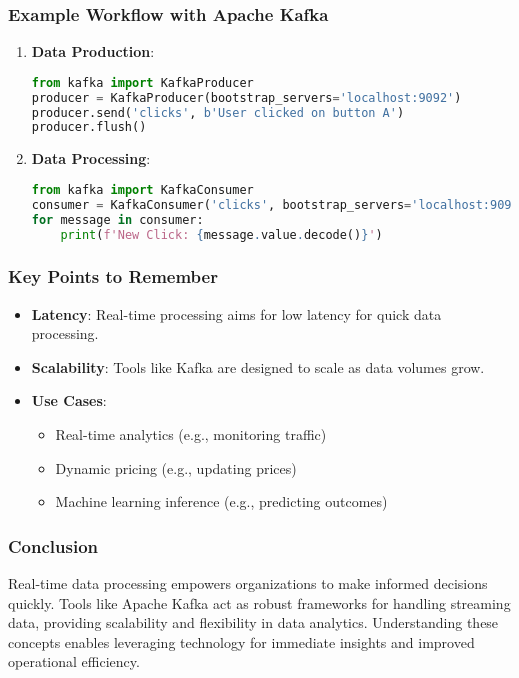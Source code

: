 \documentclass[aspectratio=169]{beamer}
\begin{document}
\begin{frame}[fragile]
    \frametitle{Example Workflow with Apache Kafka}
    \begin{enumerate}
        \item \textbf{Data Production}:
        \begin{lstlisting}[language=Python]
from kafka import KafkaProducer
producer = KafkaProducer(bootstrap_servers='localhost:9092')
producer.send('clicks', b'User clicked on button A')
producer.flush()
        \end{lstlisting}
        \item \textbf{Data Processing}:
        \begin{lstlisting}[language=Python]
from kafka import KafkaConsumer
consumer = KafkaConsumer('clicks', bootstrap_servers='localhost:9092')
for message in consumer:
    print(f'New Click: {message.value.decode()}')
        \end{lstlisting}
    \end{enumerate}
\end{frame}

\begin{frame}[fragile]
    \frametitle{Key Points to Remember}
    \begin{itemize}
        \item \textbf{Latency}: Real-time processing aims for low latency for quick data processing.
        \item \textbf{Scalability}: Tools like Kafka are designed to scale as data volumes grow.
        \item \textbf{Use Cases}:
        \begin{itemize}
            \item Real-time analytics (e.g., monitoring traffic)
            \item Dynamic pricing (e.g., updating prices)
            \item Machine learning inference (e.g., predicting outcomes)
        \end{itemize}
    \end{itemize}
\end{frame}

\begin{frame}[fragile]
    \frametitle{Conclusion}
    Real-time data processing empowers organizations to make informed decisions quickly. Tools like Apache Kafka act as robust frameworks for handling streaming data, providing scalability and flexibility in data analytics. Understanding these concepts enables leveraging technology for immediate insights and improved operational efficiency.
\end{frame}
\end{document}

